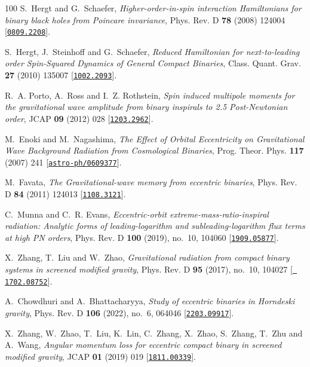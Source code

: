 \begin{thebibliography}{100}
S.~Hergt and G.~Schaefer,  {\em {Higher-order-in-spin interaction Hamiltonians
  for binary black holes from Poincare invariance}}, Phys. Rev. D {\bf 78}
  (2008) 124004 [\href{http://www.arXiv.org/abs/0809.2208}{{\tt 0809.2208}}].

S.~Hergt, J.~Steinhoff and G.~Schaefer,  {\em {Reduced Hamiltonian for
  next-to-leading order Spin-Squared Dynamics of General Compact Binaries}},
  Class. Quant. Grav. {\bf 27} (2010) 135007
  [\href{http://www.arXiv.org/abs/1002.2093}{{\tt 1002.2093}}].

R.~A. Porto, A.~Ross and I.~Z. Rothstein,  {\em {Spin induced multipole moments
  for the gravitational wave amplitude from binary inspirals to 2.5
  Post-Newtonian order}}, JCAP {\bf 09} (2012) 028
  [\href{http://www.arXiv.org/abs/1203.2962}{{\tt 1203.2962}}].

M.~Enoki and M.~Nagashima,  {\em {The Effect of Orbital Eccentricity on
  Gravitational Wave Background Radiation from Cosmological Binaries}}, Prog.
  Theor. Phys. {\bf 117} (2007) 241
  [\href{http://www.arXiv.org/abs/astro-ph/0609377}{{\tt astro-ph/0609377}}].

M.~Favata,  {\em {The Gravitational-wave memory from eccentric binaries}},
  Phys. Rev. D {\bf 84} (2011) 124013
  [\href{http://www.arXiv.org/abs/1108.3121}{{\tt 1108.3121}}].

C.~Munna and C.~R. Evans,  {\em {Eccentric-orbit extreme-mass-ratio-inspiral
  radiation: Analytic forms of leading-logarithm and subleading-logarithm flux
  terms at high PN orders}}, Phys. Rev. D {\bf 100} (2019), no.~10, 104060
  [\href{http://www.arXiv.org/abs/1909.05877}{{\tt 1909.05877}}].

X.~Zhang, T.~Liu and W.~Zhao,  {\em {Gravitational radiation from compact
  binary systems in screened modified gravity}}, Phys. Rev. D {\bf 95} (2017),
  no.~10, 104027 [\href{http://www.arXiv.org/abs/1702.08752}{{\tt
  1702.08752}}].

A.~Chowdhuri and A.~Bhattacharyya,  {\em {Study of eccentric binaries in
  Horndeski gravity}}, Phys. Rev. D {\bf 106} (2022), no.~6, 064046
  [\href{http://www.arXiv.org/abs/2203.09917}{{\tt 2203.09917}}].

X.~Zhang, W.~Zhao, T.~Liu, K.~Lin, C.~Zhang, X.~Zhao, S.~Zhang, T.~Zhu and
  A.~Wang,  {\em {Angular momentum loss for eccentric compact binary in
  screened modified gravity}}, JCAP {\bf 01} (2019) 019
  [\href{http://www.arXiv.org/abs/1811.00339}{{\tt 1811.00339}}].


\end{thebibliography}
